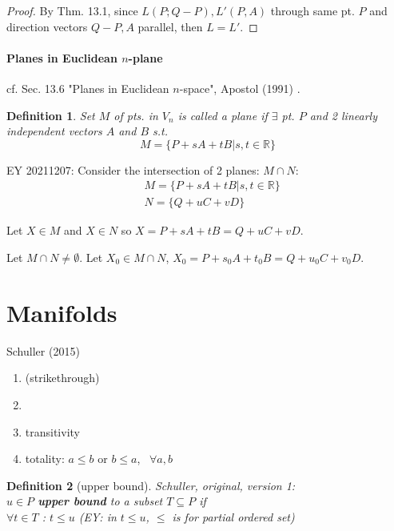 \documentclass[10pt]{amsart}
\newtheorem{definition}{Definition}
\begin{document}
\begin{multicols*}{2}
\begin{proof}
By Thm. 13.1, since $L(P;Q-P), L'(P,A)$ through same pt. $P$ and direction vectors $Q-P,A$ parallel, then $L=L'$.

\end{proof}


\subsection{Planes in Euclidean $n$-plane}

cf. Sec. 13.6 "Planes in Euclidean $n$-space", Apostol (1991) \cite{Apos1991}.

\begin{definition}
	Set $M$ of pts. in $V_n$ is called a plane if $\exists$ pt. $P$ and 2 linearly independent vectors $A$ and $B$ s.t.
	\begin{equation}
		M = \lbrace P + sA + tB | s, t \in \mathbb{R} \rbrace
	\end{equation}
\end{definition}

EY 20211207: Consider the intersection of 2 planes: $M \cap N$:
\[
\begin{aligned}
	& M = \lbrace P + sA + tB | s, t \in \mathbb{R} \rbrace \\
	& N = \lbrace Q + uC + vD \rbrace
\end{aligned}
\]

Let $X\in M$ and $X\in N$ so $X = P+sA + tB = Q+ uC + vD$. 

Let $M\cap N \neq \emptyset$. Let $X_0 \in M \cap N$, $X_0 = P + s_0 A + t_0 B = Q + u_0 C + v_0 D$.


\part{Manifolds}

Schuller (2015) \cite{Schu2015}

\begin{enumerate}
	\item (strikethrough)
	\item 
	\item transitivity
	\item totality: $a\leq b$ or $b\leq a$, \, $\forall a, b$
\end{enumerate}

\begin{definition}[upper bound]

Schuller, original, version 1: \\
$u \in P$ \textbf{upper bound} to a subset $T\subseteq P$ if \\
$\forall t \in T$ : $t\leq u$ (EY: in $t\leq u$, $\leq$ is for partial ordered set) \\


\end{definition}
\end{multicols*}
\end{document}
